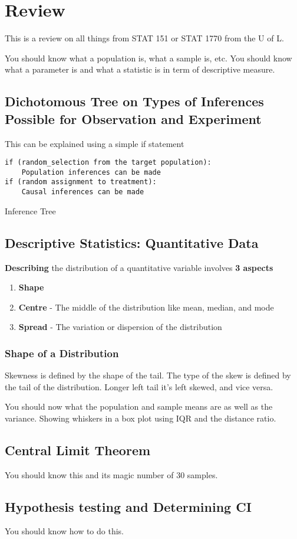 \documentclass[../STAT-252-Notes.tex]{subfiles}
\begin{document}
\chapter{Review}
This is a review on all things from STAT 151 or STAT 1770 from the U of L. 

You should know what a population is, what a sample is, etc. You should know what a parameter is and what a statistic is in term of descriptive measure. 

\section{Dichotomous Tree on Types of Inferences Possible for Observation and Experiment}
This can be explained using a simple if statement
\begin{listing}[h]
\begin{verbatim}
if (random_selection from the target population):
    Population inferences can be made
if (random assignment to treatment):
    Causal inferences can be made

\end{verbatim}
\caption{Inference Tree}
\label{lst:inference_tree}
\end{listing} 
\section{Descriptive Statistics: Quantitative Data}
\textbf{Describing} the distribution of a quantitative variable involves \textbf{3 aspects}
\begin{enumerate}
  \item \textbf{Shape}
  \item \textbf{Centre} - The middle of the distribution like mean, median, and mode
  \item \textbf{Spread} - The variation or dispersion of the distribution
\end{enumerate}

\subsection{Shape of a Distribution}
Skewness is defined by the shape of the tail. The type of the skew is defined by the tail of the distribution. Longer left tail it's left skewed, and vice versa. 

You should now what the population and sample means are as well as the variance. Showing whiskers in a box plot using IQR and the distance ratio. 

\section{Central Limit Theorem}
You should know this and its magic number of 30 samples.

\section{Hypothesis testing and Determining CI}
You should know how to do this. 
\end{document}

